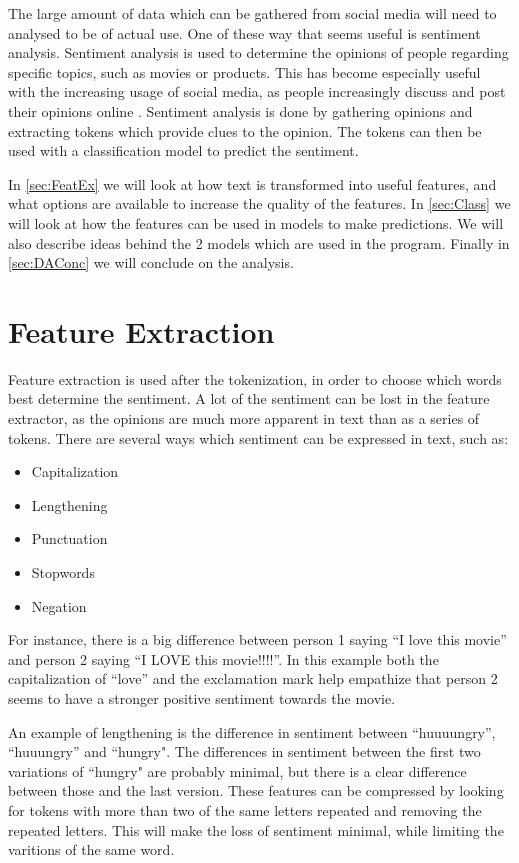 The large amount of data which can be gathered from social media will need to
analysed to be of actual use. One of these way that seems useful is sentiment
analysis. Sentiment analysis is used to determine the opinions of people
regarding specific topics, such as movies or products. This has become
especially useful with the increasing usage of social media, as people
increasingly discuss and post their opinions online \citep[Overview
2]{Sentiment}. Sentiment analysis is done by gathering opinions and extracting
tokens which provide clues to the opinion. The tokens can then be used with a
classification model to predict the sentiment.\nl

In \autoref{sec:FeatEx} we will look at how text is transformed into useful
features, and what options are available to increase the quality of the
features. In \autoref{sec:Class} we will look at how the features can be used in
models to make predictions. We will also describe ideas behind the 2 models
which are used in the program. Finally in \autoref{sec:DAConc} we will conclude
on the analysis.

\section{Feature Extraction}\label{sec:FeatEx}
Feature extraction is used after the tokenization, in order to choose which
words best determine the sentiment. A lot of the sentiment can be lost in the
feature extractor, as the opinions are much more apparent in text than as a
series of tokens. There are several ways which sentiment can be expressed in
text, such as\citep[Overview.3-4]{Sentiment}:

\begin{itemize}
  \item Capitalization 
  \item Lengthening
  \item Punctuation
  \item Stopwords
  \item Negation
\end{itemize}

For instance, there is a big difference between person 1 saying ``I love this
movie'' and person 2 saying ``I LOVE this movie!!!!''. In this example both the
capitalization of ``love'' and the exclamation mark help empathize that person
2 seems to have a stronger positive sentiment towards the movie.\nl

An example of lengthening is the difference in sentiment between ``huuuungry'',
``huuungry'' and ``hungry". The differences in sentiment between the first two
variations of ``hungry" are probably minimal, but there is a clear difference
between those and the last version. These features can be compressed by looking
for tokens with more than two of the same letters repeated and removing the
repeated letters. This will make the loss of sentiment minimal, while limiting
the varitions of the same word.\nl

